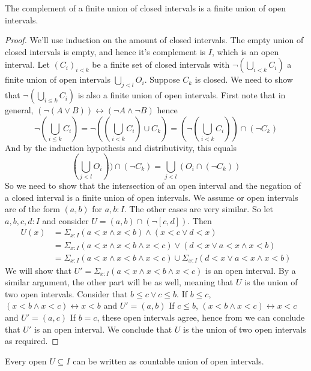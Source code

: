 \begin{lemma}\label{complementClosedIntervalOpenIntervals}
  The complement of a finite union of closed intervals is 
  a finite union of open intervals. 
\end{lemma}
\begin{proof}
  We'll use induction on the amount of closed intervals. 
  The empty union of closed intervals is empty, and hence it's complement is $I$, which is an open interval.  
  Let $(C_i)_{i<k}$ be a finite set of closed intervals with $\neg (\bigcup_{i<k}C_i)$ 
  a finite union of open intervals $\bigcup_{j<l} O_i$. 
  Suppose $C_{k}$ is closed. We need to show that 
  $\neg (\bigcup_{i\leq k} C_i)$ is also a finite union of open intervals. 
  First note that in general, 
  $(\neg (A \vee B ))\leftrightarrow (\neg A \wedge \neg B)$
  hence 
  $$
  \neg (\bigcup_{i\leq k} C_i)
  = 
  \neg ((\bigcup_{i<k} C_i) \cup C_k) 
  =
  (\neg (\bigcup_{i<k} C_i) )\cap (\neg C_k) 
  $$
  And by the induction hypothesis and distributivity, this equals 
  $$
  (\bigcup_{j<l} O_i) ) \cap (\neg C_k) 
  =
  \bigcup_{j<l} (O_i \cap (\neg C_k) )
  $$
  So we need to show that the intersection of an open interval and the negation of a closed interval is a 
  finite union of open intervals. We assume or open intervals are of the form $(a,b)$ for $a,b:I$. 
  The other cases are very similar. 
  So let $a,b,c,d:I$ and consider 
  $U = (a,b) \cap (\neg [c,d])$. 
  Then 
  \begin{align} 
    U(x) &= \Sigma_{x:I}  
  (a < x \wedge x < b) \wedge ( x < c \vee d < x)\\
  &= \Sigma_{x:I}
  (a < x \wedge x < b \wedge x < c ) \vee ( d < x \vee a<x \wedge x < b)\\
  &= 
  \Sigma_{x:I}
  (a < x \wedge x < b \wedge x < c ) 
  \cup 
  \Sigma_{x:I}
  ( d < x \vee a<x \wedge x < b)
  \end{align} 
  We will show that 
  $U' = \Sigma_{x:I}(a < x \wedge x < b \wedge x < c ) $ is an open interval. 
  By a similar argument, the other part will be as well, meaning that $U$ is the union of two open intervals. 
  Consider that $b\leq c \vee c \leq b$. 
  If $b \leq c$, $(x<b \wedge x< c) \leftrightarrow x<b$ and $U' = (a,b)$
  If $c \leq b$, $(x<b \wedge x< c) \leftrightarrow x<c$ and $U' = (a,c)$
  If $b=c$, these open intervals agree, hence from  we can conclude that $U'$ is an open interval. 
  We conclude that $U$ is the union of two open intervals as required. 
\end{proof}
%
\begin{lemma}
  Every open $U\subseteq I$ can be written as countable union of open intervals.
\end{lemma} 
